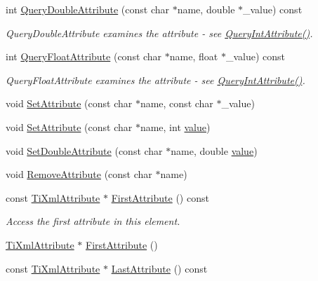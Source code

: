 \begin{DoxyCompactItemize}
\item 
int \hyperlink{class_ti_xml_element_ae04bad29ddb281a7e6c662b3882e9928}{Query\+Double\+Attribute} (const char $\ast$name, double $\ast$\+\_\+value) const
\begin{DoxyCompactList}\small\item\em Query\+Double\+Attribute examines the attribute -\/ see \hyperlink{class_ti_xml_element_a5c0f739e0f6f5905a201364532e54a60}{Query\+Int\+Attribute()}. \end{DoxyCompactList}\item 
int \hyperlink{class_ti_xml_element_a5591929834178699b4561ab6ab460068}{Query\+Float\+Attribute} (const char $\ast$name, float $\ast$\+\_\+value) const
\begin{DoxyCompactList}\small\item\em Query\+Float\+Attribute examines the attribute -\/ see \hyperlink{class_ti_xml_element_a5c0f739e0f6f5905a201364532e54a60}{Query\+Int\+Attribute()}. \end{DoxyCompactList}\item 
void \hyperlink{class_ti_xml_element_abf0b3bd7f0e4c746a89ec6e7f101fc32}{Set\+Attribute} (const char $\ast$name, const char $\ast$\+\_\+value)
\item 
void \hyperlink{class_ti_xml_element_ace6f4be75e373726d4774073d666d1a7}{Set\+Attribute} (const char $\ast$name, int \hyperlink{class_ti_xml_node_aead528b3cedc33c16a6c539872c7cc8b}{value})
\item 
void \hyperlink{class_ti_xml_element_a0d1dd975d75496778177e35abfe0ec0b}{Set\+Double\+Attribute} (const char $\ast$name, double \hyperlink{class_ti_xml_node_aead528b3cedc33c16a6c539872c7cc8b}{value})
\item 
void \hyperlink{class_ti_xml_element_a56979767deca794376b1dfa69a525b2a}{Remove\+Attribute} (const char $\ast$name)
\item 
const \hyperlink{class_ti_xml_attribute}{Ti\+Xml\+Attribute} $\ast$ \hyperlink{class_ti_xml_element_a003131b1bbf0b8054b11571c1b9a4d3a}{First\+Attribute} () const
\begin{DoxyCompactList}\small\item\em Access the first attribute in this element. \end{DoxyCompactList}\item 
\hyperlink{class_ti_xml_attribute}{Ti\+Xml\+Attribute} $\ast$ \hyperlink{class_ti_xml_element_a4b33780fc565d38d6b54f640e0cf1737}{First\+Attribute} ()
\item 
const \hyperlink{class_ti_xml_attribute}{Ti\+Xml\+Attribute} $\ast$ \hyperlink{class_ti_xml_element_a42939f55ed4cec5fc1daaecfded7ba16}{Last\+Attribute} () const

\end{DoxyCompactItemize}

